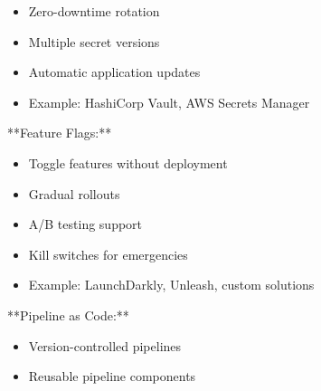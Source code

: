 \documentclass[11pt,a4paper]{article}
\begin{document}
\begin{itemize}
\item Zero-downtime rotation
\end{itemize}

\begin{itemize}
\item Multiple secret versions
\end{itemize}

\begin{itemize}
\item Automatic application updates
\end{itemize}

\begin{itemize}
\item Example: HashiCorp Vault, AWS Secrets Manager
\end{itemize}

**Feature Flags:**

\begin{itemize}
\item Toggle features without deployment
\end{itemize}

\begin{itemize}
\item Gradual rollouts
\end{itemize}

\begin{itemize}
\item A/B testing support
\end{itemize}

\begin{itemize}
\item Kill switches for emergencies
\end{itemize}

\begin{itemize}
\item Example: LaunchDarkly, Unleash, custom solutions
\end{itemize}

**Pipeline as Code:**

\begin{itemize}
\item Version-controlled pipelines
\end{itemize}

\begin{itemize}
\item Reusable pipeline components
\end{itemize}
\end{document}
